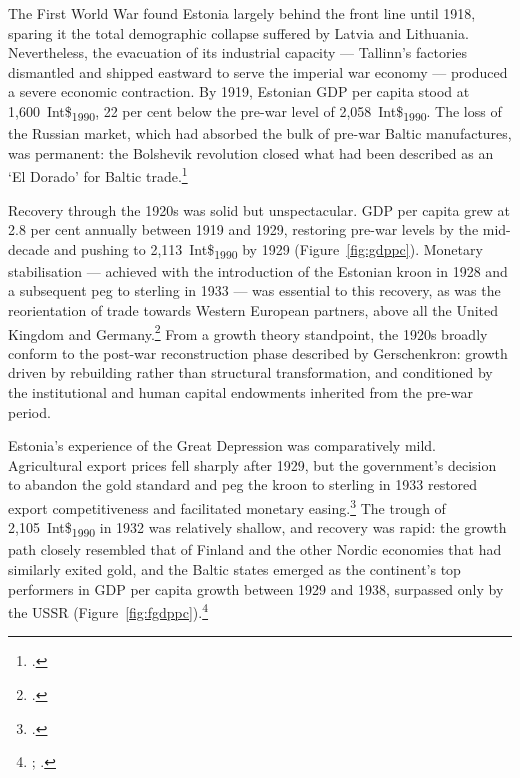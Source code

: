 \documentclass[12pt,a4paper]{article}
\newcommand{\intlnineteen}{Int\$\textsubscript{1990}}   %
\begin{document}
%

The First World War found Estonia largely behind the front line until 1918, sparing it the total demographic collapse suffered by Latvia and Lithuania. Nevertheless, the evacuation of its industrial capacity — Tallinn's factories dismantled and shipped eastward to serve the imperial war economy — produced a severe economic contraction. By 1919, Estonian GDP per capita stood at 1,600~\intlnineteen{}, 22 per cent below the pre-war level of 2,058~\intlnineteen{}. The loss of the Russian market, which had absorbed the bulk of pre-war Baltic manufactures, was permanent: the Bolshevik revolution closed what had been described as an `El Dorado' for Baltic trade.\footnote{\autocite[51, 57]{russia_eldorado}.}

Recovery through the 1920s was solid but unspectacular. GDP per capita grew at 2.8 per cent annually between 1919 and 1929, restoring pre-war levels by the mid-decade and pushing to 2,113~\intlnineteen{} by 1929 (Figure~\ref{fig:gdppc}). Monetary stabilisation — achieved with the introduction of the Estonian kroon in 1928 and a subsequent peg to sterling in 1933 — was essential to this recovery, as was the reorientation of trade towards Western European partners, above all the United Kingdom and Germany.\footnote{\autocite[74]{bernankejames01}.} From a growth theory standpoint, the 1920s broadly conform to the post-war reconstruction phase described by Gerschenkron: growth driven by rebuilding rather than structural transformation, and conditioned by the institutional and human capital endowments inherited from the pre-war period.

Estonia's experience of the Great Depression was comparatively mild. Agricultural export prices fell sharply after 1929, but the government's decision to abandon the gold standard and peg the kroon to sterling in 1933 restored export competitiveness and facilitated monetary easing.\footnote{\autocite[74]{bernankejames01}.} The trough of 2,105~\intlnineteen{} in 1932 was relatively shallow, and recovery was rapid: the growth path closely resembled that of Finland and the other Nordic economies that had similarly exited gold, and the Baltic states emerged as the continent's top performers in GDP per capita growth between 1929 and 1938, surpassed only by the USSR (Figure~\ref{fig:fgdppc}).\footnote{\autocite[184, 198--200]{finlandeh01}; \autocite{grytten_nordicdepression}.}
\end{document}
